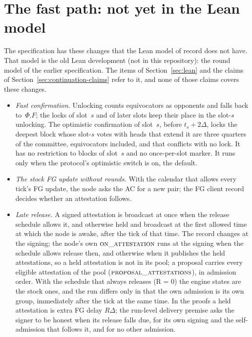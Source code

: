 \documentclass{article}
\newcommand{\Fr}{\Phi}
\newcommand{\fname}[1]{\text{\textsc{#1}}}
\begin{document}
\section{The fast path: not yet in the Lean model}\label{sec:fast-path}

The specification has these
changes that the Lean model of record does not have.  That model is the
old Lean development (not in this repository): the round model of the earlier
specification.  The items of Section~\ref{sec:lean} and the claims of
Section~\ref{sec:continuation-claims} refer to it, and none of those
claims covers these changes.
\begin{itemize}
\item[(P1)] \emph{Fast confirmation.}  Unlocking counts equivocators as
  opponents and falls back to~$\Fr.F$; the locks of slot~$s$ and of later
  slots keep their place in the slot-$s$ unlocking.  The optimistic
  confirmation of slot~$s$, before $t_s+2\Delta$, locks the deepest block
  whose slot-$s$ votes with heads that extend it are three quarters of the
  committee, equivocators included, and that conflicts with no lock.  It
  has no restriction to blocks of slot~$s$ and no once-per-slot marker.
  It runs only when the protocol's optimistic switch is on, the default.
\item[(P2)] \emph{The stock FG update without rounds.}  With the calendar
  that allows every tick's FG update, the node
  asks the AC for a new pair; the FG client record decides whether an
  attestation follows.
\item[(P2$'$)] \emph{Late release.}  A signed attestation is broadcast at
  once when the release schedule allows it, and otherwise held and broadcast
  at the first allowed time at which the node is awake, after the tick of
  that time.  The record changes at the signing; the node's own
  $\fname{on\_attestation}$ runs at the signing when the schedule allows
  release then, and otherwise when it publishes the held attestations, so a
  held attestation is not in its pool; a proposal carries every eligible
  attestation of the pool ($\fname{proposal\_attestations}$), in admission
  order.
  With the schedule that always releases (R = 0) the engine states are the
  stock ones, and the run differs only in that the own admission is its own
  group, immediately after the tick at the same time.  In the proofs a held attestation is extra FG delay
  $R\Delta$; the run-level delivery premise asks the signer to be honest when
  its release falls due, for its own signing and the self-admission that
  follows it, and for no other admission.

\end{itemize}
\end{document}
